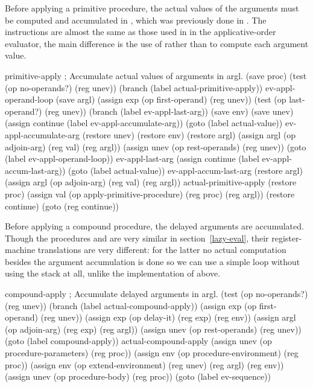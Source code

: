 \begin{exe}[5.25]
    Before applying a primitive procedure, the actual values of the arguments 
    must be computed and accumulated in , which was previously done 
    in . The instructions are almost the same as those used 
    in  in the applicative-order evaluator, the main 
    difference is the use of  rather than 
     to compute each argument value.
    \begin{cscm}
    primitive-apply
        ; Accumulate actual values of arguments in argl.
        (save proc)
        (test (op no-operands?) (reg unev))
        (branch (label actual-primitive-apply))
    ev-appl-operand-loop
        (save argl)
        (assign exp (op first-operand) (reg unev))
        (test (op last-operand?) (reg unev))
        (branch (label ev-appl-last-arg))
        (save env)
        (save unev)
        (assign continue (label ev-appl-accumulate-arg))
        (goto (label actual-value))
    ev-appl-accumulate-arg
        (restore unev)
        (restore env)
        (restore argl)
        (assign argl (op adjoin-arg) (reg val) (reg argl))
        (assign unev (op rest-operands) (reg unev))
        (goto (label ev-appl-operand-loop))
    ev-appl-last-arg
        (assign continue (label ev-appl-accum-last-arg))
        (goto (label actual-value))
    ev-appl-accum-last-arg
        (restore argl)
        (assign argl (op adjoin-arg) (reg val) (reg argl))
    actual-primitive-apply
        (restore proc)
        (assign val (op apply-primitive-procedure) (reg proc) (reg argl))
        (restore continue)
        (goto (reg continue))
    \end{cscm}

    Before applying a compound procedure, the delayed arguments are accumulated. 
    Though the procedures  and 
     are very similar in section~\ref{lazy-eval}, 
    their register-machine translations are very different: for the latter no 
    actual computation besides the argument accumulation is done so we can use 
    a simple loop without using the stack at all, unlike the implementation of 
     above.
    \begin{cscm}
    compound-apply
        ; Accumulate delayed arguments in argl.
        (test (op no-operands?) (reg unev))
        (branch (label actual-compound-apply))
        (assign exp (op first-operand) (reg unev))
        (assign exp (op delay-it) (reg exp) (reg env))
        (assign argl (op adjoin-arg) (reg exp) (reg argl))
        (assign unev (op rest-operands) (reg unev))
        (goto (label compound-apply))
    actual-compound-apply
        (assign unev (op procedure-parameters) (reg proc))
        (assign env (op procedure-environment) (reg proc))
        (assign env (op extend-environment) (reg unev) (reg argl) (reg env))
        (assign unev (op procedure-body) (reg proc))
        (goto (label ev-sequence))
    \end{cscm}
\end{exe}
